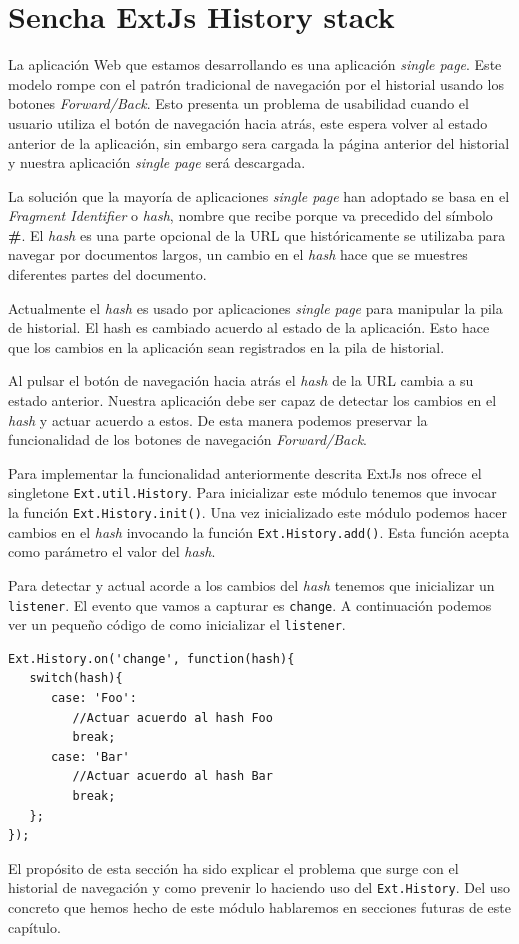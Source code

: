 \section{Sencha ExtJs History stack}
	La aplicación Web que estamos desarrollando es una aplicación \emph{single page}. Este modelo rompe con el patrón tradicional de navegación
	por el historial usando los botones \emph{Forward/Back}. Esto presenta un problema de usabilidad cuando el usuario utiliza el botón de
	navegación hacia atrás, este espera volver al estado anterior de la aplicación, sin embargo sera cargada la página anterior del historial y
	nuestra aplicación \emph{single page} será descargada.
	\par
	La solución que la mayoría de aplicaciones \emph{single page} han adoptado se basa en el \emph{Fragment Identifier}  o \emph{hash}, nombre que
	recibe porque va precedido del símbolo \textbf{\#}. El \emph{hash} es una parte opcional de la URL que históricamente se utilizaba para navegar
	por documentos largos, un cambio en el \emph{hash} hace que se muestres diferentes partes del documento.
	\par
	Actualmente el \emph{hash} es usado por aplicaciones \emph{single page} para manipular la pila de historial. El hash es cambiado acuerdo al
	estado de la aplicación. Esto hace que los cambios en la aplicación sean registrados en la pila de historial.
	\par
	Al pulsar el botón de navegación hacia atrás el \emph{hash} de la URL cambia a su estado anterior. Nuestra aplicación debe ser capaz de
	detectar los cambios en el \emph{hash} y actuar acuerdo a estos. De esta manera podemos preservar la funcionalidad de los botones de
	navegación \emph{Forward/Back}. 
	\par
	Para implementar la funcionalidad anteriormente descrita ExtJs nos ofrece el singletone \texttt{Ext.util.History}. Para inicializar este módulo
	tenemos que invocar la función \texttt{Ext.History.init()}. Una vez inicializado este módulo podemos hacer cambios en el \emph{hash} invocando
	la función \texttt{Ext.History.add()}. Esta función acepta como parámetro el valor del \emph{hash}. 
	\par
	Para detectar y actual acorde a los cambios del \emph{hash} tenemos que inicializar un \texttt{listener}. El evento que vamos a capturar es
	\texttt{change}. A continuación podemos ver un pequeño código de como inicializar el \texttt{listener}.
	\begin{lstlisting}
Ext.History.on('change', function(hash){
   switch(hash){
      case: 'Foo':
         //Actuar acuerdo al hash Foo
         break;
      case: 'Bar'
         //Actuar acuerdo al hash Bar
         break;
   };
});
	\end{lstlisting}
	\par
	El propósito de esta sección ha sido explicar el problema que surge con el historial de navegación y como prevenir lo haciendo uso del
	\texttt{Ext.History}. Del uso concreto que hemos hecho de este módulo hablaremos en secciones futuras de este capítulo.


